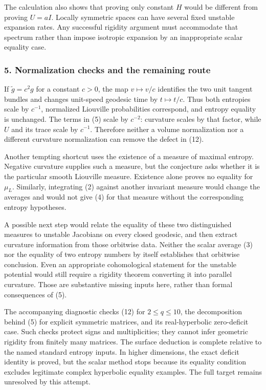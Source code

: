\documentclass[11pt]{article}
\begin{document}
The calculation also shows that proving only constant $H$ would be different from proving $U=aI$. Locally symmetric spaces can have several fixed unstable expansion rates. Any successful rigidity argument must accommodate that spectrum rather than impose isotropic expansion by an inappropriate scalar equality case.

\subsubsection{5. Normalization checks and the remaining route}
If $\widetilde g=c^2g$ for a constant $c>0$, the map $v\mapsto v/c$ identifies the two unit tangent bundles and changes unit-speed geodesic time by $t\mapsto t/c$. Thus both entropies scale by $c^{-1}$, normalized Liouville probabilities correspond, and entropy equality is unchanged. The terms in (5) scale by $c^{-2}$: curvature scales by that factor, while $U$ and its trace scale by $c^{-1}$. Therefore neither a volume normalization nor a different curvature normalization can remove the defect in (12).

Another tempting shortcut uses the existence of a measure of maximal entropy. Negative curvature supplies such a measure, but the conjecture asks whether it is the particular smooth Liouville measure. Existence alone proves no equality for $\mu_L$. Similarly, integrating (2) against another invariant measure would change the averages and would not give (4) for that measure without the corresponding entropy hypotheses.

A possible next step would relate the equality of these two distinguished measures to unstable Jacobians on every closed geodesic, and then extract curvature information from those orbitwise data. Neither the scalar average (3) nor the equality of two entropy numbers by itself establishes that orbitwise conclusion. Even an appropriate cohomological statement for the unstable potential would still require a rigidity theorem converting it into parallel curvature. Those are substantive missing inputs here, rather than formal consequences of (5).

The accompanying diagnostic checks (12) for $2\leq q\leq10$, the decomposition behind (5) for explicit symmetric matrices, and its real-hyperbolic zero-deficit case. Such checks protect signs and multiplicities; they cannot infer geometric rigidity from finitely many matrices. The surface deduction is complete relative to the named standard entropy inputs. In higher dimensions, the exact deficit identity is proved, but the scalar method stops because its equality condition excludes legitimate complex hyperbolic equality examples. The full target remains unresolved by this attempt.
\end{document}
